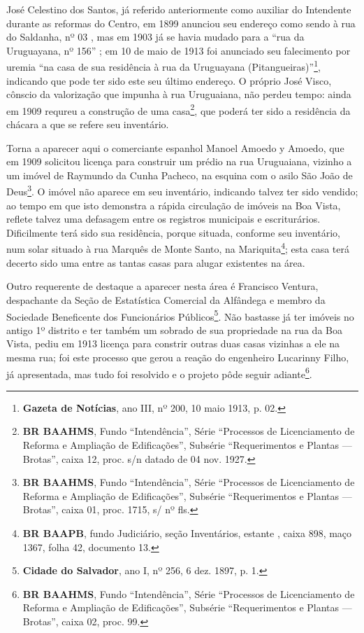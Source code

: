 José Celestino dos Santos, já referido anteriormente como auxiliar do Intendente durante as reformas do Centro, em 1899 anunciou seu endereço como sendo à rua do Saldanha, nº 03 \cite[p.~477]{almanak_1899}, mas em 1903 já se havia mudado para a ``rua da Uruguayana, nº 156'' \cite[p.~345]{reis_almanak_1903}; em 10 de maio de 1913 foi anunciado seu falecimento por uremia ``na casa de sua residência à rua da Uruguayana (Pitangueiras)''\footnote{\textbf{Gazeta de Notícias}, ano III, nº 200, 10 maio 1913, p. 02.}, indicando que pode ter sido este seu último endereço. O próprio José Visco, cônscio da valorização que impunha à rua Uruguaiana, não perdeu tempo: ainda em 1909 requreu a construção de uma casa\footnote{\textbf{BR BAAHMS}, Fundo ``Intendência'', Série ``Processos de Licenciamento de Reforma e Ampliação de Edificações'', Subsérie ``Requerimentos e Plantas --- Brotas'', caixa 12, proc. s/n datado de 04 nov. 1927.}, que poderá ter sido a residência da chácara a que se refere seu inventário.

Torna a aparecer aqui o comerciante espanhol Manoel Amoedo y Amoedo, que em 1909 solicitou licença para construir um prédio na rua Uruguaiana, vizinho a um imóvel de Raymundo da Cunha Pacheco, na esquina com o asilo São João de Deus\footnote{\textbf{BR BAAHMS}, Fundo ``Intendência'', Série ``Processos de Licenciamento de Reforma e Ampliação de Edificações'', Subsérie ``Requerimentos e Plantas --- Brotas'', caixa 01, proc. 1715, s/ nº fls.}. O imóvel não aparece em seu inventário, indicando talvez ter sido vendido; ao tempo em que isto demonstra a rápida circulação de imóveis na Boa Vista, reflete talvez uma defasagem entre os registros municipais e escriturários. Dificilmente terá sido sua residência, porque situada, conforme seu inventário, num solar situado à rua Marquês de Monte Santo, na Mariquita\footnote{\textbf{BR BAAPB}, fundo Judiciário, seção Inventários, estante , caixa 898, maço 1367, folha 42, documento 13.}; esta casa terá decerto sido uma entre as tantas casas para alugar existentes na área.

Outro requerente de destaque a aparecer nesta área é Francisco Ventura, despachante da Seção de Estatística Comercial da Alfândega \cite[p.~307]{reis_almanak_1898} e membro da Sociedade Beneficente dos Funcionários Públicos\footnote{\textbf{Cidade do Salvador}, ano I, nº 256, 6 dez. 1897, p. 1.}. Não bastasse já ter imóveis no antigo 1º distrito e ter também um sobrado de sua propriedade na rua da Boa Vista, pediu em 1913 licença para constrir outras duas casas vizinhas a ele na mesma rua; foi este processo que gerou a reação do engenheiro Lucarinny Filho, já apresentada, mas tudo foi resolvido e o projeto pôde seguir adiante\footnote{\textbf{BR BAAHMS}, Fundo ``Intendência'', Série ``Processos de Licenciamento de Reforma e Ampliação de Edificações'', Subsérie ``Requerimentos e Plantas --- Brotas'', caixa 02, proc. 99.}.

